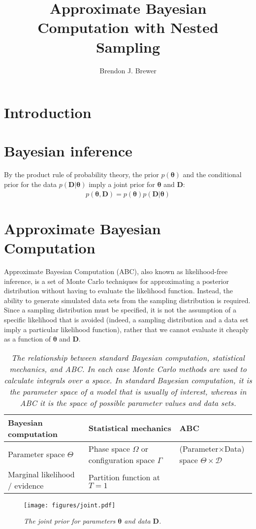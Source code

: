 \documentclass[a4paper, 11pt]{article}
\title{Approximate Bayesian Computation with Nested Sampling}
\author{Brendon J. Brewer}
\newcommand{\params}{\boldsymbol{\theta}}	%
\newcommand{\data}{\boldsymbol{D}}  %
\begin{document}
\maketitle

\section{Introduction}


\section{Bayesian inference}
By the product rule of probability theory, the prior $p(\params)$ and the
conditional prior for the data $p(\data | \params)$ imply a joint prior
for $\params$ and $\data$:
\begin{equation}
\begin{array}{lr}
p(\params, \data) = p(\params)p(\data|\params)
\end{array}
\end{equation}

\section{Approximate Bayesian Computation}
Approximate Bayesian Computation (ABC), also known as likelihood-free inference,
is a set of Monte Carlo techniques for approximating a posterior distribution
without having to evaluate the likelihood function. Instead, the ability to
generate simulated data sets from the sampling distribution is required.
Since a sampling distribution must be specified, it is not the assumption of
a specific likelihood that is avoided (indeed, a sampling distribution and
a data set imply a particular likelihood function), rather that we cannot
evaluate it cheaply as a function of $\params$ and $\data$.

\begin{table}[ht!]
\centering
\small
\begin{tabular}{lll}
\hline
Bayesian computation		&		Statistical mechanics		&		ABC\\
\hline
Parameter space	$\Theta$	&		Phase space	$\Omega$ or configuration space $\Gamma$ 			& (Parameter$\times$Data) space $\Theta \times \mathcal{D}$\\		
Marginal likelihood / evidence	&	Partition function at $T=1$	&\\


\end{tabular}
\caption{\it The relationship between standard Bayesian computation, statistical
mechanics, and ABC. In each case Monte Carlo methods are used to calculate
integrals over a space. In standard Bayesian computation, it is the parameter
space of a model that is usually of interest, whereas in ABC it is the space
of possible parameter values {\it and} data sets.
\label{tab:relation}}
\end{table}


\begin{figure}[ht!]
\centering
\texttt{[image: figures/joint.pdf]}
\caption{\it The joint prior for parameters $\params$ and data $\data$.
\label{fig:joint}}
\end{figure}
\end{document}
